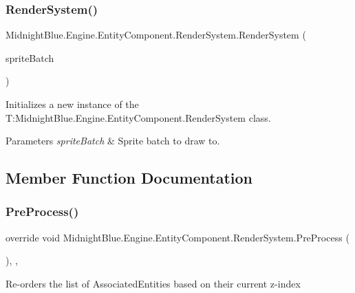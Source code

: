 \subsubsection{\texorpdfstring{Render\+System()}{RenderSystem()}}
{\footnotesize\ttfamily Midnight\+Blue.\+Engine.\+Entity\+Component.\+Render\+System.\+Render\+System (\begin{DoxyParamCaption}\item[{Sprite\+Batch}]{sprite\+Batch }\end{DoxyParamCaption})\hspace{0.3cm}{\ttfamily [inline]}}



Initializes a new instance of the T\+:\+Midnight\+Blue.\+Engine.\+Entity\+Component.\+Render\+System class. 


\begin{DoxyParams}{Parameters}
{\em sprite\+Batch} & Sprite batch to draw to.\\
\hline
\end{DoxyParams}


\subsection{Member Function Documentation}
\hypertarget{class_midnight_blue_1_1_engine_1_1_entity_component_1_1_render_system_a0c3d20164cc31ae45aa5e0814b08f08f}{}\label{class_midnight_blue_1_1_engine_1_1_entity_component_1_1_render_system_a0c3d20164cc31ae45aa5e0814b08f08f} 
\subsubsection{\texorpdfstring{Pre\+Process()}{PreProcess()}}
{\footnotesize\ttfamily override void Midnight\+Blue.\+Engine.\+Entity\+Component.\+Render\+System.\+Pre\+Process (\begin{DoxyParamCaption}{ }\end{DoxyParamCaption})\hspace{0.3cm}{\ttfamily [inline]}, {\ttfamily [protected]}, {\ttfamily [virtual]}}



Re-\/orders the list of Associated\+Entities based on their current z-\/index 



